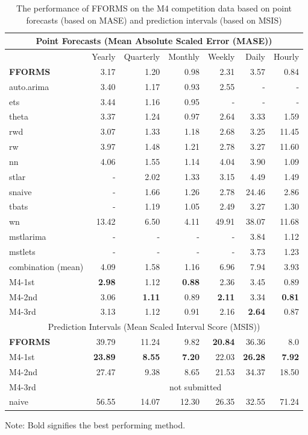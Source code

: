 \documentclass[11pt,a4paper,]{article}
\begin{document}
\begin{table}[!h]
\centering\scriptsize\tabcolsep=0.12cm
\begin{threeparttable}
\caption{The performance of FFORMS on the M4 competition data based on point forecasts (based on MASE) and prediction intervals (based on MSIS)}
\label{forecasts}
\begin{tabular}{l|rrrrrr}
\hline
\multicolumn{7}{c}{Point Forecasts (Mean Absolute Scaled Error (MASE))} \\\hline
 & Yearly & Quarterly & Monthly & Weekly & Daily & Hourly \\\hline
\bf{FFORMS} & 3.17 &  1.20 &  0.98&  2.31& 3.57 &  0.84\\
auto.arima & 3.40 &1.17  &0.93  & 2.55 &  -& - \\
ets & 3.44 &  1.16& 0.95 &  -&-  &  -\\
theta & 3.37 &1.24  & 0.97 &2.64  & 3.33 & 1.59 \\
rwd & 3.07 & 1.33 & 1.18  & 2.68  & 3.25 & 11.45 \\
rw & 3.97 & 1.48 & 1.21  &2.78  & 3.27 & 11.60 \\
nn & 4.06 & 1.55 &  1.14 &4.04 & 3.90 & 1.09 \\
stlar & - & 2.02 &  1.33& 3.15 & 4.49 & 1.49 \\
snaive & - &  1.66& 1.26 &  2.78& 24.46 & 2.86 \\
tbats & - & 1.19 &  1.05& 2.49 & 3.27 &  1.30\\
wn & 13.42 &  6.50&  4.11&  49.91& 38.07 & 11.68 \\
mstlarima & - & - &  - & - & 3.84 &  1.12\\
mstlets & - &  - &  - &  - & 3.73 &  1.23\\
combination (mean) & 4.09 & 1.58 &  1.16&6.96  & 7.94 & 3.93 \\\hline
M4-1st & \bf{2.98} & 1.12 &  \bf{0.88}& 2.36 & 3.45 & 0.89\\
M4-2nd & 3.06 & \bf{1.11} &  0.89& \bf{2.11} & 3.34 & \bf{0.81}\\
M4-3rd & 3.13 & 1.12 &  0.91& 2.16 & \bf{2.64} & 0.87\\\hline
\multicolumn{7}{c}{Prediction Intervals (Mean Scaled Interval Score (MSIS))} \\\hline
\bf{FFORMS} & 39.79 &  11.24 &  9.82&  \bf{20.84}& 36.36 & 8.0 \\
M4-1st & \bf{23.89} & \bf{8.55} &  \bf{7.20} & 22.03 & \bf{26.28} & \bf{7.92}\\
M4-2nd & 27.47 & 9.38 &  8.65& 21.53 & 34.37 & 18.50\\
M4-3rd & \multicolumn{6}{c}{not submitted}\\
naive & 56.55 & 14.07 &  12.30 & 26.35 & 32.55 & 71.24\\\hline
\end{tabular}
  \begin{tablenotes}
      \small
      \item Note: Bold signifies the best performing method.
    \end{tablenotes}
  \end{threeparttable}
\end{table}
\end{document}

